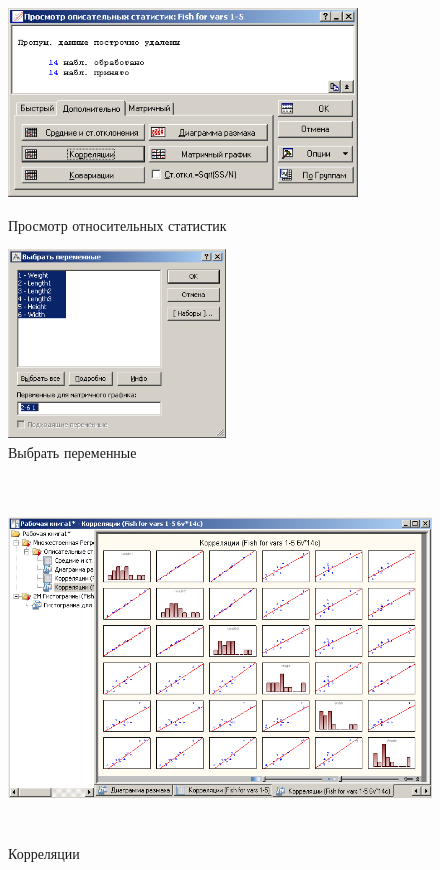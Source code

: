 \begin{figure}[!h]
  \centering
  \begin{minipage}{0.49\textwidth}
    \centering

    \includegraphics[height=5cm]
    {inc/var5__17.PNG}

    \caption{Просмотр относительных статистик}
    \label{fig:var5__17}
  \end{minipage}
  \begin{minipage}{0.49\textwidth}
    \centering

    \includegraphics[height=5cm]
    {inc/var5__18.PNG}

    \caption{Выбрать переменные}
    \label{fig:var5__18}
  \end{minipage}
\end{figure}

\begin{figure}[!h]
  \centering

  \includegraphics[height=9.6cm]
  {inc/var5__19.PNG}

  \caption{Корреляции}

  \label{fig:var5__19}
\end{figure}


